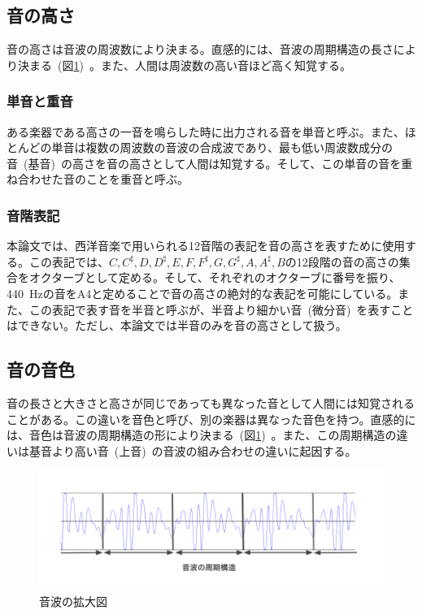 
\subsection{音の高さ}

音の高さは音波の周波数により決まる。直感的には、音波の周期構造の長さにより決まる~(図\ref{fig:gakuon2})~。また、人間は周波数の高い音ほど高く知覚する。

\subsubsection{単音と重音}

ある楽器である高さの一音を鳴らした時に出力される音を単音と呼ぶ。また、ほとんどの単音は複数の周波数の音波の合成波であり、最も低い周波数成分の音~(基音)~の高さを音の高さとして人間は知覚する。そして、この単音の音を重ね合わせた音のことを重音と呼ぶ。

\subsubsection{音階表記}

本論文では、西洋音楽で用いられる12音階の表記を音の高さを表すために使用する。この表記では、$C,C^{\sharp},D,D^{\sharp},E,F,F^{\sharp},G,G^{\sharp},A,A^{\sharp},B$の12段階の音の高さの集合をオクターブとして定める。そして、それぞれのオクターブに番号を振り、440~Hzの音をA4と定めることで音の高さの絶対的な表記を可能にしている。また、この表記で表す音を半音と呼ぶが、半音より細かい音~(微分音)~を表すことはできない。ただし、本論文では半音のみを音の高さとして扱う。

\subsection{音の音色}

音の長さと大きさと高さが同じであっても異なった音として人間には知覚されることがある。この違いを音色と呼び、別の楽器は異なった音色を持つ。直感的には、音色は音波の周期構造の形により決まる~(図\ref{fig:gakuon2})~。また、この周期構造の違いは基音より高い音~(上音)~の音波の組み合わせの違いに起因する。

\begin{figure}[b]
\begin{center}
\includegraphics[width=\hsize]{figure/gakuon2.png}
\caption{音波の拡大図}
\label{fig:gakuon2}
\end{center}
\end{figure}

